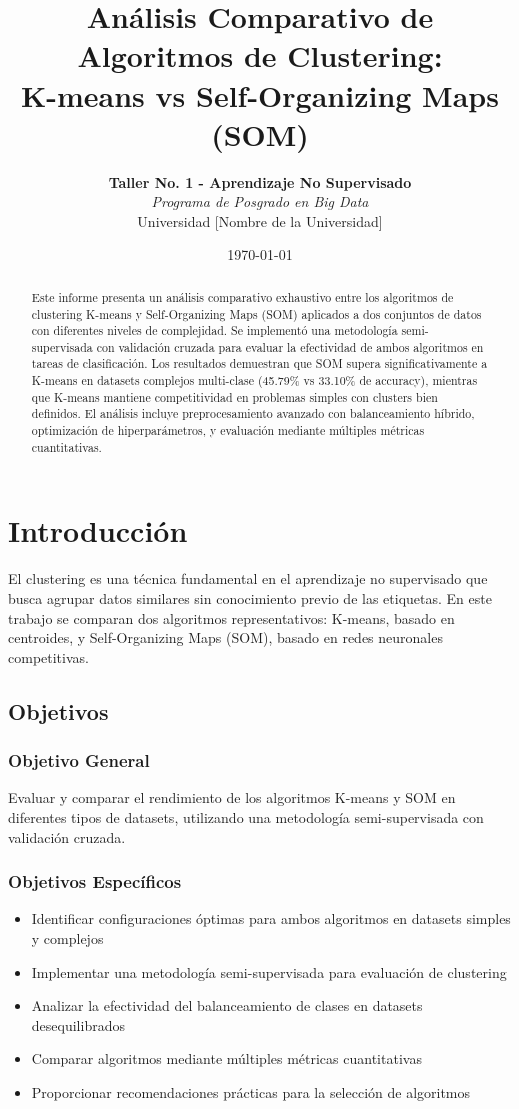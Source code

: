 \documentclass[12pt,a4paper]{article}
\title{\textbf{Análisis Comparativo de Algoritmos de Clustering:\\ K-means vs Self-Organizing Maps (SOM)}}
\author{
    \textbf{Taller No. 1 - Aprendizaje No Supervisado}\\
    \textit{Programa de Posgrado en Big Data}\\
    Universidad [Nombre de la Universidad]
}
\date{\today}
\begin{document}
\maketitle

\begin{abstract}
Este informe presenta un análisis comparativo exhaustivo entre los algoritmos de clustering K-means y Self-Organizing Maps (SOM) aplicados a dos conjuntos de datos con diferentes niveles de complejidad. Se implementó una metodología semi-supervisada con validación cruzada para evaluar la efectividad de ambos algoritmos en tareas de clasificación. Los resultados demuestran que SOM supera significativamente a K-means en datasets complejos multi-clase (45.79\% vs 33.10\% de accuracy), mientras que K-means mantiene competitividad en problemas simples con clusters bien definidos. El análisis incluye preprocesamiento avanzado con balanceamiento híbrido, optimización de hiperparámetros, y evaluación mediante múltiples métricas cuantitativas.
\end{abstract}

\tableofcontents
\newpage

\section{Introducción}

El clustering es una técnica fundamental en el aprendizaje no supervisado que busca agrupar datos similares sin conocimiento previo de las etiquetas. En este trabajo se comparan dos algoritmos representativos: K-means, basado en centroides, y Self-Organizing Maps (SOM), basado en redes neuronales competitivas.

\subsection{Objetivos}

\subsubsection{Objetivo General}
Evaluar y comparar el rendimiento de los algoritmos K-means y SOM en diferentes tipos de datasets, utilizando una metodología semi-supervisada con validación cruzada.

\subsubsection{Objetivos Específicos}
\begin{itemize}
    \item Identificar configuraciones óptimas para ambos algoritmos en datasets simples y complejos
    \item Implementar una metodología semi-supervisada para evaluación de clustering
    \item Analizar la efectividad del balanceamiento de clases en datasets desequilibrados
    \item Comparar algoritmos mediante múltiples métricas cuantitativas
    \item Proporcionar recomendaciones prácticas para la selección de algoritmos
\end{itemize}
\end{document}

